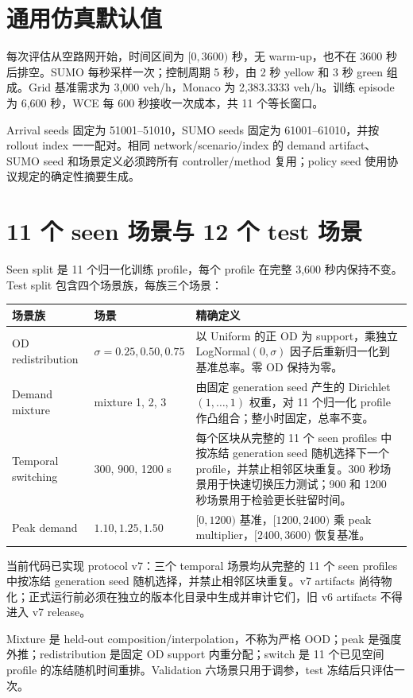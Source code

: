 \section{通用仿真默认值}
每次评估从空路网开始，时间区间为 $[0,3600)$ 秒，无 warm-up，也不在 3600 秒后排空。SUMO 每秒采样一次；控制周期 5 秒，由 2 秒 yellow 和 3 秒 green 组成。Grid 基准需求为 3,000 veh/h，Monaco 为 2,383.3333 veh/h。训练 episode 为 6,600 秒，WCE 每 600 秒接收一次成本，共 11 个等长窗口。

Arrival seeds 固定为 51001--51010，SUMO seeds 固定为 61001--61010，并按 rollout index 一一配对。相同 network/scenario/index 的 demand artifact、SUMO seed 和场景定义必须跨所有 controller/method 复用；policy seed 使用协议规定的确定性摘要生成。

\section{11 个 seen 场景与 12 个 test 场景}
Seen split 是 11 个归一化训练 profile，每个 profile 在完整 3,600 秒内保持不变。Test split 包含四个场景族，每族三个场景：

\begin{longtable}{@{}p{}p{}p{}@{}}
\toprule
场景族 & 场景 & 精确定义 \\
\midrule
OD redistribution & $\sigma=0.25,0.50,0.75$ & 以 Uniform 的正 OD 为 support，乘独立 LogNormal$(0,\sigma)$ 因子后重新归一化到基准总率。零 OD 保持为零。\\
Demand mixture & mixture 1, 2, 3 & 由固定 generation seed 产生的 Dirichlet$(1,\ldots,1)$ 权重，对 11 个归一化 profile 作凸组合；整小时固定，总率不变。\\
Temporal switching & 300, 900, 1200 s & 每个区块从完整的 11 个 seen profiles 中按冻结 generation seed 随机选择下一个 profile，并禁止相邻区块重复。300 秒场景用于快速切换压力测试；900 和 1200 秒场景用于检验更长驻留时间。\\
Peak demand & $1.10,1.25,1.50$ & $[0,1200)$ 基准，$[1200,2400)$ 乘 peak multiplier，$[2400,3600)$ 恢复基准。\\
\bottomrule
\end{longtable}

当前代码已实现 protocol v7：三个 temporal 场景均从完整的 11 个 seen profiles 中按冻结 generation seed 随机选择，并禁止相邻区块重复。v7 artifacts 尚待物化；正式运行前必须在独立的版本化目录中生成并审计它们，旧 v6 artifacts 不得进入 v7 release。

Mixture 是 held-out composition/interpolation，不称为严格 OOD；peak 是强度外推；redistribution 是固定 OD support 内重分配；switch 是 11 个已见空间 profile 的冻结随机时间重排。Validation 六场景只用于调参，test 冻结后只评估一次。

